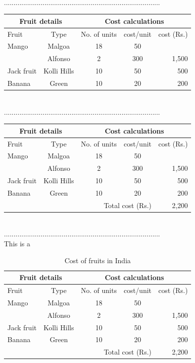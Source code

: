 \documentclass[12pt,a4paper]{article}
\begin{document}
\\.................................................................................\\
\begin{tabular}{||l|c|c|c|r|}\hline
\multicolumn{2}{||c|}{Fruit details} & \multicolumn{3}{c|}{Cost calculations} \\ \hline
Fruit & Type & No. of units & cost/unit & cost (Rs.)\\ \hline
Mango & Malgoa & 18 & 50 & \\ \cline{2-4} %
		 & Alfonso & 2 & 300 & 1,500 \\ \hline
Jack fruit & Kolli Hills & 10 & 50 & 500\\ \hline
Banana & Green & 10 & 20 & 200\\ \hline
\end{tabular}
\\.................................................................................\\
\begin{tabular}{||l|c|c|c|r|}\hline
\multicolumn{2}{||c|}{Fruit details} & \multicolumn{3}{c|}{Cost calculations} \\ \hline
Fruit & Type & No. of units & cost/unit & cost (Rs.)\\ \hline
Mango & Malgoa & 18 & 50 & \\ \cline{2-4}
		 & Alfonso & 2 & 300 & 1,500 \\ \hline
Jack fruit & Kolli Hills & 10 & 50 & 500\\ \hline
Banana & Green & 10 & 20 & 200\\ \hline
\multicolumn{4}{||r|}{Total cost (Rs.)} & {2,200} \\ \hline
\end{tabular}
\\.................................................................................\\
\newpage
This is a
\begin{table} %
\centering %
\caption{Cost of fruits in India} %
\vspace{1ex} %
\begin{tabular}{||l|c|c|c|r|}\hline
\multicolumn{2}{||c|}{Fruit details} & \multicolumn{3}{c|}{Cost calculations} \\ \hline
Fruit & Type & No. of units & cost/unit & cost (Rs.)\\ \hline
Mango & Malgoa & 18 & 50 & \\ \cline{2-4}
		 & Alfonso & 2 & 300 & 1,500 \\ \hline
Jack fruit & Kolli Hills & 10 & 50 & 500\\ \hline
Banana & Green & 10 & 20 & 200\\ \hline
\multicolumn{4}{||r|}{Total cost (Rs.)} & {2,200} \\ \hline
\end{tabular}
\end{table}
\end{document}
